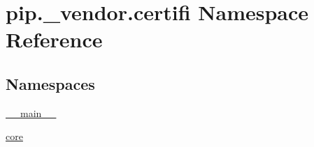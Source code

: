 \hypertarget{namespacepip_1_1__vendor_1_1certifi}{}\section{pip.\+\_\+vendor.\+certifi Namespace Reference}
\label{namespacepip_1_1__vendor_1_1certifi}
\subsection*{Namespaces}
\begin{DoxyCompactItemize}
\item 
 \hyperlink{namespacepip_1_1__vendor_1_1certifi_1_1____main____}{\+\_\+\+\_\+main\+\_\+\+\_\+}
\item 
 \hyperlink{namespacepip_1_1__vendor_1_1certifi_1_1core}{core}
\end{DoxyCompactItemize}
